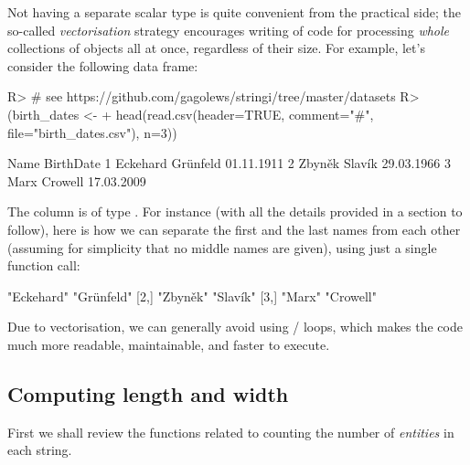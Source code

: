 \documentclass[nojss]{jss}
\begin{document}
\noindent
Not having a separate scalar type is quite convenient
from the practical side; the so-called
\emph{vectorisation} strategy encourages writing of code for processing
\textit{whole} collections of objects all at once, regardless of their size.
For example, let's consider the following data frame:


\begin{Schunk}
\begin{Sinput}
R> # see https://github.com/gagolews/stringi/tree/master/datasets
R> (birth_dates <-
+    head(read.csv(header=TRUE, comment="#", file="birth_dates.csv"), n=3))
\end{Sinput}
\begin{Soutput}
               Name  BirthDate
1 Eckehard Grünfeld 01.11.1911
2     Zbyněk Slavík 29.03.1966
3      Marx Crowell 17.03.2009
\end{Soutput}
\end{Schunk}

\noindent
The  column is of type .
For instance (with all the details provided in a section to follow),
here is how we can separate the first and the last names from
each other (assuming for simplicity that no middle names are given),
using just a single function call:

\begin{Schunk}
\begin{Soutput}
     [,1]       [,2]
[1,] "Eckehard" "Grünfeld"
[2,] "Zbyněk"   "Slavík"
[3,] "Marx"     "Crowell"
\end{Soutput}
\end{Schunk}

\noindent
Due to {vectorisation}, we can generally
avoid using / loops,
which makes the code much more readable, maintainable, and faster to execute.





\subsection{Computing length and width}


First we shall review the functions related to counting
the number of \textit{entities} in each string.
\end{document}
